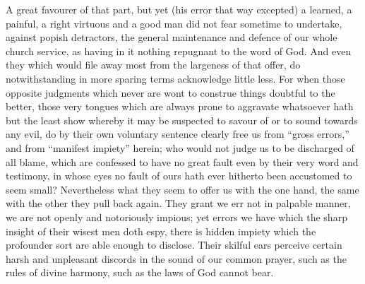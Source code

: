 A great favourer of that part, but yet (his error that way excepted) a learned, a painful, a right virtuous and a good man did not fear sometime to undertake, against popish detractors, the general maintenance and defence of our whole church service, as having in it nothing repugnant to the word of God. And even they which would file away most from the largeness of that offer, do notwithstanding in more sparing terms acknowledge little less. For when those opposite judgments which never are wont to construe things doubtful to the better, those very tongues which are always prone to aggravate whatsoever hath but the least show whereby it may be suspected to savour of or to sound towards any evil, do by their own voluntary sentence clearly free us from “gross errors,” and from “manifest impiety” herein; who would not judge us to be discharged of all blame, which are confessed to have no great fault even by their very word and testimony, in whose eyes no fault of ours hath ever hitherto been accustomed to seem small?
Nevertheless what they seem to offer us with the one hand, the same with the other they pull back again. They grant we err not in palpable manner, we are not openly and  notoriously impious; yet errors we have which the sharp insight of their wisest men doth espy, there is hidden impiety which the profounder sort are able enough to disclose. Their skilful ears perceive certain harsh and unpleasant discords in the sound of our common prayer, such as the rules of divine harmony, such as the laws of God cannot bear.

